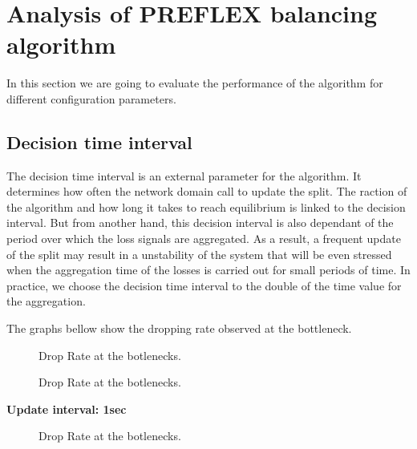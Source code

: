 \section{Analysis of PREFLEX balancing algorithm}

In this section we are going to evaluate the performance of the algorithm for different configuration parameters. 

\subsection{Decision time interval}

The decision time interval is an external parameter for the algorithm. It determines how often the network domain call to update the split. The raction of the algorithm and how long it takes to reach equilibrium is linked to the decision interval. But from another hand, this decision interval is also dependant of the period over which the loss signals are aggregated. As a result, a frequent update of the split may result in a unstability of the system that will be even stressed when the aggregation time of the losses is carried out for small periods of time. In practice, we choose the decision time interval to the double of the time value for the aggregation.

The graphs bellow show the dropping rate observed at the bottleneck. 

\begin{figure}[h]
 \begin{center}

\caption{
  Drop Rate at the botlenecks. 
    \label{fig:split-eight}
}
\end{center}
\end{figure}

 \begin{figure}[h!]
 \begin{center}
\caption{
  Drop Rate at the botlenecks.
    \label{fig:split-time-four}
}
\end{center}
\end{figure}

\clearpage

{\bf Update interval: 1sec}

\begin{figure}[h]
 \begin{center}

\caption{
  Drop Rate at the botlenecks.
    \label{fig:split-one}
}
\end{center}
\end{figure}

